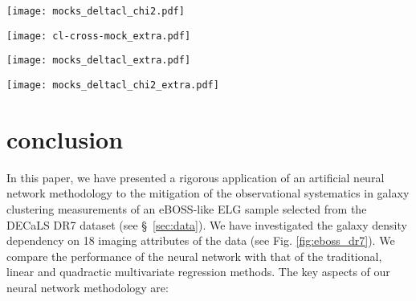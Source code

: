 \documentclass[fleqn, usenatbib]{mnras}
\begin{document}
\begin{figure*}
\centering
\texttt{[image: mocks\_deltacl\_chi2.pdf]}
\caption{To better quantify the bias introduced by each method, we evaluate the dependence of the bias on the lowest bin $\ell_{{\rm min}}$ that is included in the $\chi^{2}$ computation.}\label{fig:chi2clmock}
\end{figure*}

\begin{figure*}
\centering
\texttt{[image: cl-cross-mock\_extra.pdf]}
\caption{Cross power spectrum of the contaminated mock catalogs and the imaging attributes for different mitigation techniques. Our defaul neural network method with feature selection is shown in solid red while the performance without feature selection (`Neural Network (Plain)') is shown in dashed blue. The dark grey shaded region shows the 1$\sigma$ confidence region of the mean of the 100 mocks, and the light grey region shows the typical 1-$\sigma$ confidence region of one mock. The mitigation with the ground truth contamination model is shown with a purple dot-dashed curve as `cont. with linear (truth)'. \label{fig:clcrossmock}}
\end{figure*}
 
\begin{figure*}
\centering
\texttt{[image: mocks\_deltacl\_extra.pdf]}
\caption{Same as Fig. \ref{fig:deltaclmock} showing the auto power spectrum results mitigated with the few imaging maps `few' (to demonstrate under-correction), neural network without the feature selection `plain', and the ground truth contamination model `truth'.}
\label{fig:mockdclextra}
\end{figure*}

\begin{figure*}
\centering
\texttt{[image: mocks\_deltacl\_chi2\_extra.pdf]}
\caption{Same as Fig. \ref{fig:chi2clmock} showing the dependence of the bias after mitigation with the few imaging maps `few', neural network without the feature selection `plain', and the ground truth contamination model `truth'.}
\end{figure*}

\section{conclusion}\label{sec:conclusion}

In this paper, we have presented a rigorous application of an artificial neural network methodology to the mitigation of the observational systematics in galaxy clustering measurements of an eBOSS-like ELG sample selected from the DECaLS DR7 dataset (see \S~\ref{sec:data}). We have investigated the galaxy density dependency on 18 imaging attributes of the data (see Fig. \ref{fig:eboss_dr7}). We compare the performance of the neural network with that of the traditional, linear and quadractic multivariate regression methods. The key aspects of our neural network methodology are:\\
\end{document}
